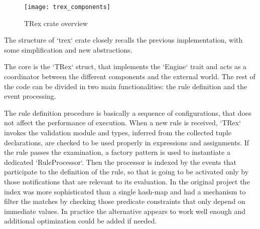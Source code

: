 \begin{figure}[h]
  \centering
  \texttt{[image: trex\_components]}
  \caption{TRex crate overview}
\end{figure}

The structure of `trex` crate closely recalls the previous implementation, with some simplification and new abstractions.

The core is the `TRex` struct, that implements the `Engine` trait and acts as a coordinator between the different components and the external world. The rest of the code can be divided in two main functionalities: the rule definition and the event processing.

The rule definition procedure is basically a sequence of configurations, that does not affect the performance of execution. When a new rule is received, `TRex` invokes the validation module and types, inferred from the collected tuple declarations, are checked to be used properly in expressions and assignments. If the rule passes the examination, a factory pattern is used to instantiate a dedicated `RuleProcessor`. Then the processor is indexed by the events that participate to the definition of the rule, so that is going to be activated only by those notifications that are relevant to its evaluation. In the original project the index was more sophisticated than a single hash-map and had a mechanism to filter the matches by checking those predicate constraints that only depend on immediate values. In practice the alternative appears to work well enough and additional optimization could be added if needed.

